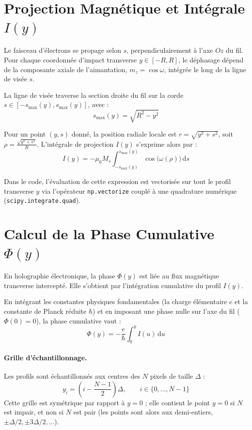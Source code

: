 \documentclass[11pt, a4paper]{article}
\begin{document}
\section{Projection Magnétique et Intégrale $I(y)$}
Le faisceau d'électrons se propage selon $s$, perpendiculairement à l'axe $Oz$ du fil. Pour chaque coordonnée d'impact transverse $y \in [-R, R]$, le déphasage dépend de la composante axiale de l'aimantation, $m_z = \cos\omega$, intégrée le long de la ligne de visée $s$.

La ligne de visée traverse la section droite du fil sur la corde $s \in [-s_{\text{max}}(y), s_{\text{max}}(y)]$, avec :
\begin{equation}
    s_{\text{max}}(y) = \sqrt{R^2 - y^2}
\end{equation}

Pour un point $(y, s)$ donné, la position radiale locale est $r = \sqrt{y^2 + s^2}$, soit $\rho = \frac{\sqrt{y^2 + s^2}}{R}$. L'intégrale de projection $I(y)$ s'exprime alors par :
\begin{equation}
    I(y) = -\mu_0 M_s \int_{-s_{\text{max}}(y)}^{s_{\text{max}}(y)} \cos\big(\omega(\rho)\big) \, \mathrm{d}s
\end{equation}

Dans le code, l'évaluation de cette expression est vectorisée sur tout le profil transverse $y$ via l'opérateur \texttt{np.vectorize} couplé à une quadrature numérique (\texttt{scipy.integrate.quad}).

\section{Calcul de la Phase Cumulative $\Phi(y)$}
En holographie électronique, la phase $\Phi(y)$ est liée au flux magnétique transverse intercepté. Elle s'obtient par l'intégration cumulative du profil $I(y)$.

En intégrant les constantes physiques fondamentales (la charge élémentaire $e$ et la constante de Planck réduite $\hbar$) et en imposant une phase nulle sur l'axe du fil ($\Phi(0) = 0$), la phase cumulative vaut :
\begin{equation}
    \Phi(y) = -\frac{e}{\hbar} \int_{0}^{y} I(u) \, \mathrm{d}u
\end{equation}

\paragraph{Grille d'échantillonnage.} Les profils sont échantillonnés aux centres des $N$ pixels de taille $\Delta$ :
\begin{equation}
    y_i = \left(i - \frac{N-1}{2}\right)\Delta, \qquad i \in \{0, \dots, N-1\}
\end{equation}
Cette grille est symétrique par rapport à $y = 0$ ; elle contient le point $y = 0$ si $N$ est impair, et non si $N$ est pair (les points sont alors aux demi-entiers, $\pm\Delta/2, \pm 3\Delta/2, \dots$).
\end{document}

